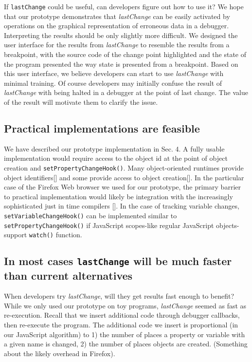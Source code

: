 \documentclass[runningheads,a4paper]{llncs}
\begin{document}
If \texttt{lastChange} could be useful, can developers figure out how
to use it? We hope that our prototype demonstrates that
\textit{lastChange} can be easily activated by operations on the
graphical representation of erroneous data in a debugger. Interpreting
the results should be only slightly more difficult. We designed the
user interface for the results from \textit{lastChange} to resemble
the results from a breakpoint, with the source code of the change
point highlighted and the state of the program presented the way state
is presented from a breakpoint. Based on this user interface, we
believe developers can start to use \textit{lastChange} with minimal
training. Of course developers may initially confuse the result of
\textit{lastChange} with being halted in a debugger at the point of
last change. The value of the result will motivate them to clarify the
issue.

\subsection{Practical implementations are feasible}

We have described our prototype implementation in Sec. 4. A fully usable
implementation would require access to the object id at the point of
object creation and \texttt{setPropertyChangeHook()}. Many
object-oriented runtimes provide object identifiers[] and some
provide access to object creation[]. In the particular case of
the Firefox Web browser we used for our prototype, the primary barrier
to practical implementation would likely be integration with the
increasingly sophisticated just in time compilers []. In the case of
tracking variable changes, \texttt{setVariableChangeHook()} can be implemented
similar to \texttt{setPropertyChangeHook()} if JavaScript scopes-like regular 
JavaScript objects-support \texttt{watch()} function.

\subsection{In most cases \protect\texttt{lastChange} will be much faster than current alternatives}
When developers try \textit{lastChange}, will they get results fast
enough to benefit? While we only used our prototype on toy programs,
\textit{lastChange} seemed as fast as re-execution.  Recall that we
insert additional code through debugger callbacks, then re-execute the
program. The additional code we insert is proportional (in our
JavaScript algorithm) to 1) the number of places a property or
variable with a given name is changed, 2) the number of places objects
are created. (Something about the likely overhead in Firefox).
\end{document}
